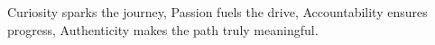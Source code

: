 \documentclass[preview]{standalone}
\begin{document}
\begin{center}
Curiosity sparks the journey, Passion fuels the drive, Accountability ensures progress, Authenticity makes the path truly meaningful.
\end{center}
\end{document}

